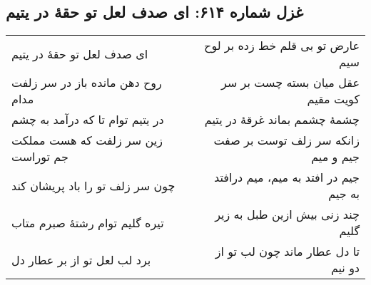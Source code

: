 \begin{center}
\section*{غزل شماره ۶۱۴: ای صدف لعل تو حقهٔ در یتیم}
\label{sec:614}
\begin{longtable}{l p{0.5cm} r}
ای صدف لعل تو حقهٔ در یتیم
&&
عارض تو بی قلم خط زده بر لوح سیم
\\
روح دهن مانده باز در سر زلفت مدام
&&
عقل میان بسته چست بر سر کویت مقیم
\\
در یتیم توام تا که درآمد به چشم
&&
چشمهٔ چشمم بماند غرقهٔ در یتیم
\\
زین سر زلفت که هست مملکت جم توراست
&&
زانکه سر زلف توست بر صفت جیم و میم
\\
چون سر زلف تو را باد پریشان کند
&&
جیم در افتد به میم، میم درافتد به جیم
\\
تیره گلیم توام رشتهٔ صبرم متاب
&&
چند زنی بیش ازین طبل به زیر گلیم
\\
برد لب لعل تو از بر عطار دل
&&
تا دل عطار ماند چون لب تو از دو نیم
\\
\end{longtable}
\end{center}
